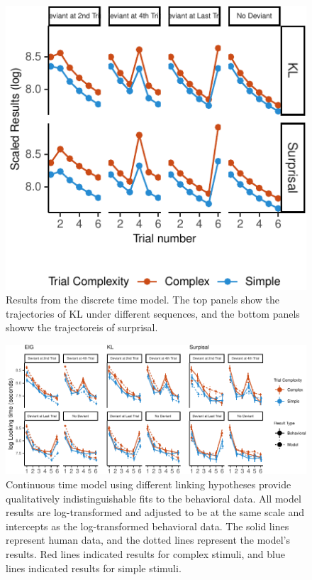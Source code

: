 \documentclass[10pt, letterpaper]{article}
\newenvironment{CodeChunk}{}{}
\begin{document}
\begin{CodeChunk}
\begin{figure}[h]

{\centering \includegraphics{figs/basic_result-1} 

}

\caption[Results from the discrete time model]{Results from the discrete time model. The top panels show the trajectories of KL under different sequences, and the bottom panels showw the trajectoreis of surprisal.}\label{fig:basic_result}
\end{figure}
\end{CodeChunk}

\begin{CodeChunk}
\begin{figure}[h]

{\centering \includegraphics{figs/experiment_res-1} 

}

\caption[Continuous time model using different linking hypotheses provide qualitatively indistinguishable fits to the behavioral data]{Continuous time model using different linking hypotheses provide qualitatively indistinguishable fits to the behavioral data. All model results are log-transformed and adjusted to be at the same scale and intercepts as the log-transformed behavioral data. The solid lines represent human data, and the dotted lines represent the model's results. Red lines indicated results for complex stimuli, and blue lines indicated results for simple stimuli.}\label{fig:experiment_res}
\end{figure}
\end{CodeChunk}
\end{document}
